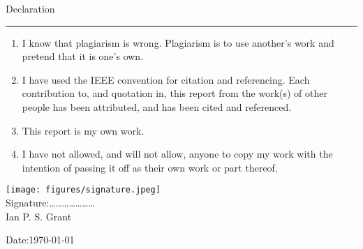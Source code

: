 \thispagestyle{empty}
\vskip 40mm

{\Large Declaration}\\
\hrule

\vskip 10mm
\begin{enumerate}
\item I know that plagiarism is wrong. Plagiarism is to use another's work and pretend that it is one's
own.
\item I have used the IEEE convention for citation and referencing. Each contribution to, and quotation in,
this report from the work(s) of other people has been attributed, and has been cited and
referenced.
\item This report is my own work.
\item I have not allowed, and will not allow, anyone to copy my work with the intention of passing it off
as their own work or part thereof.
\end{enumerate}
\vskip 10mm
\hspace{2cm}\texttt{[image: figures/signature.jpeg]}\\
Signature:\ldots\ldots\ldots\ldots\ldots\ldots\ldots\\
Ian P. S. Grant
		
\vskip10mm
Date:\quad\quad\quad \today

\fancyfoot[C]{\thepage}